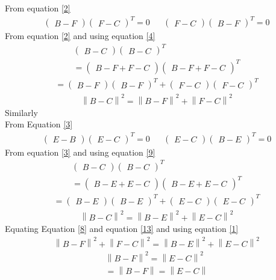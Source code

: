 \documentclass[journal,12pt,twocolumn]{IEEEtran}
\newcommand{\myvec}[1]{\ensuremath{\begin{pmatrix}#1\end{pmatrix}}}
\newcommand{\norm}[1]{\left\lVert#1\right\rVert}
\begin{document}
From equation {\ref{2}}
\begin{align}
    \myvec{B-F}\myvec{F-C}^T=0 && \myvec{F-C}\myvec{B-F}^T=0\label{4}
\end{align}
From equation {\ref{2}} and using equation {\ref{4}} 
\begin{align}
    \myvec{B-C}\myvec{B-C}^T\\
    =\myvec{B-F+F-C}\myvec{B-F+F-C}^T
    \end{align}
    \begin{align}
      =\myvec{B-F}\myvec{B-F}^T+\myvec{F-C}\myvec{F-C}^T 
    \end{align}
\begin{align}
   \norm{B-C}^2=\norm{B-F}^2+\norm{F-C}^2\label{8} 
    \end{align}
    Similarly\\
    From Equation {\ref{3}}
    \begin{align}
        \myvec{E-B}\myvec{E-C}^T=0 && \myvec{E-C}\myvec{B-E}^T=0\label{9}
        \end{align}
From equation {\ref{3}} and using equation {\ref{9}}  
\begin{align}
    \myvec{B-C}\myvec{B-C}^T\\
    =\myvec{B-E+E-C}\myvec{B-E+E-C}^T
    \end{align}
    \begin{align}
      =\myvec{B-E}\myvec{B-E}^T+\myvec{E-C}\myvec{E-C}^T 
    \end{align}
\begin{align}
   \norm{B-C}^2=\norm{B-E}^2+\norm{E-C}^2\label{13}
    \end{align}        
    Equating Equation \ref{8} and equation \ref{13} and using equation \ref{1}
    \begin{align}
      \norm{B-F}^2+\norm{F-C}^2 = \norm{B-E}^2+\norm{E-C}^2  
    \end{align}
    \begin{align}
       \norm{B-F}^2=\norm{E-C}^2\\
       =\norm{B-F}=\norm{E-C}\label{16}
    \end{align}
    
\end{document}
